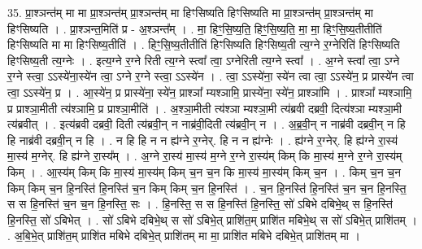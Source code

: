 \documentclass[17pt]{extarticle}
\begin{document}
35. प्रा॒श्ञन्त॑म् मा मा प्रा॒श्ञन्त॑म् प्रा॒श्ञन्त॑म् मा हिꣳसिष्यति हिꣳसिष्यति मा प्रा॒श्ञन्त॑म् प्रा॒श्ञन्त॑म् मा हिꣳसिष्यति । . प्रा॒श्ञन्त॒मिति॑ प्र - अ॒श्ञन्त᳚म् । . मा॒ हिꣳ॒॒सि॒ष्य॒ति॒ हिꣳ॒॒सि॒ष्य॒ति॒ मा॒ मा॒ हिꣳ॒॒सि॒ष्य॒तीतीति॑ हिꣳसिष्यति मा मा हिꣳसिष्य॒तीति॑ । . हिꣳ॒॒सि॒ष्य॒तीतीति॑ हिꣳसिष्यति हिꣳसिष्य॒ती त्य॒ग्ने र॒ग्नेरिति॑ हिꣳसिष्यति हिꣳसिष्य॒ती त्य॒ग्नेः । . इत्य॒ग्ने र॒ग्ने रिती त्य॒ग्ने स्त्वा᳚ त्वा॒ ऽग्नेरिती त्य॒ग्ने स्त्वा᳚ । . अ॒ग्ने स्त्वा᳚ त्वा॒ ऽग्ने र॒ग्ने स्त्वा॒ ऽऽस्ये॑ना॒स्ये॑न त्वा॒ ऽग्ने र॒ग्ने स्त्वा॒ ऽऽस्ये॑न । . त्वा॒ ऽऽस्ये॑ना॒ स्ये॑न त्वा त्वा॒ ऽऽस्ये॑न॒ प्र प्रास्ये॑न त्वा त्वा॒ ऽऽस्ये॑न॒ प्र । . आ॒स्ये॑न॒ प्र प्रास्ये॑ना॒ स्ये॑न॒ प्राश्ञा᳚ म्यश्ञामि॒ प्रास्ये॑ना॒ स्ये॑न॒ प्राश्ञा॑मि । . प्राश्ञा᳚ म्यश्ञामि॒ प्र प्राश्ञा॒मीती त्य॑श्ञामि॒ प्र प्राश्ञा॒मीति॑ । . अ॒श्ञा॒मीती त्य॑श्ञा म्यश्ञा॒मी त्य॑ब्रवी दब्रवी॒ दित्य॑श्ञा म्यश्ञा॒मी त्य॑ब्रवीत् । . इत्य॑ब्रवी दब्रवी॒ दिती त्य॑ब्रवी॒न् न नाब्र॑वी॒दिती त्य॑ब्रवी॒न् न । . अ॒ब्र॒वी॒न् न नाब्र॑वी दब्रवी॒न् न हि हि नाब्र॑वी दब्रवी॒न् न हि । . न हि हि न न ह्य॑ग्ने र॒ग्नेर्. हि न न ह्य॑ग्नेः । . ह्य॑ग्ने र॒ग्नेर्. हि ह्य॑ग्ने रा॒स्य॑ मा॒स्य॑ म॒ग्नेर्. हि ह्य॑ग्ने रा॒स्य᳚म् । . अ॒ग्ने रा॒स्य॑ मा॒स्य॑ म॒ग्ने र॒ग्ने रा॒स्य॑म् किम् कि मा॒स्य॑ म॒ग्ने र॒ग्ने रा॒स्य॑म् किम् । . आ॒स्य॑म् किम् कि मा॒स्य॑ मा॒स्य॑म् किम् च॒न च॒न कि मा॒स्य॑ मा॒स्य॑म् किम् च॒न । . किम् च॒न च॒न किम् किम् च॒न हि॒नस्ति॑ हि॒नस्ति॑ च॒न किम् किम् च॒न हि॒नस्ति॑ । . च॒न हि॒नस्ति॑ हि॒नस्ति॑ च॒न च॒न हि॒नस्ति॒ स स हि॒नस्ति॑ च॒न च॒न हि॒नस्ति॒ सः । . हि॒नस्ति॒ स स हि॒नस्ति॑ हि॒नस्ति॒ सो॑ ऽबिभे दबिभे॒थ् स हि॒नस्ति॑ हि॒नस्ति॒ सो॑ ऽबिभेत् । . सो॑ ऽबिभे दबिभे॒थ् स सो॑ ऽबिभे॒त् प्राशि॑त॒म् प्राशि॑त मबिभे॒थ् स सो॑ ऽबिभे॒त् प्राशि॑तम् । . अ॒बि॒भे॒त् प्राशि॑त॒म् प्राशि॑त मबिभे दबिभे॒त् प्राशि॑तम् मा मा॒ प्राशि॑त मबिभे दबिभे॒त् प्राशि॑तम् मा । \newline
\pagebreak
{}
\end{document}

